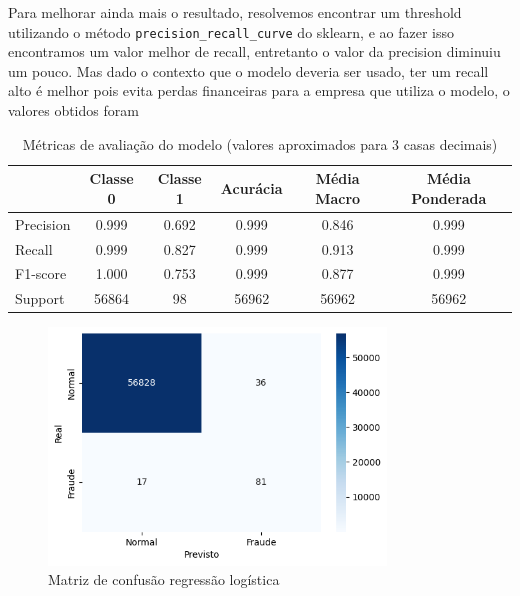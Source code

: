 \documentclass[conference]{IEEEtran}
\begin{document}
  Para melhorar ainda mais o resultado, resolvemos encontrar um threshold utilizando o método \texttt{precision\_recall\_curve} do sklearn, e ao fazer isso encontramos um valor melhor de recall, entretanto o valor da precision diminuiu um pouco. Mas dado o contexto que o modelo deveria ser usado, ter um recall alto é melhor pois evita perdas financeiras para a empresa que utiliza o modelo, o valores obtidos foram
  \begin{table}[H]
    \centering
    \begin{tabular}{lccccc}
        \toprule
                           & \textbf{Classe 0} & \textbf{Classe 1} & \textbf{Acurácia} & \textbf{Média Macro} & \textbf{Média Ponderada} \\
        \midrule
        Precision  & 0.999  & 0.692  & 0.999  & 0.846  & 0.999   \\
        Recall     & 0.999  & 0.827  & 0.999  & 0.913  & 0.999   \\
        F1-score   & 1.000  & 0.753  & 0.999  & 0.877  & 0.999   \\
        Support    & 56864  & 98     & 56962  & 56962  & 56962   \\
        \bottomrule
    \end{tabular}
    \caption{Métricas de avaliação do modelo (valores aproximados para 3 casas decimais)}
    \label{tab:matriz_confusao_regressao_logistica_com_threshold}
\end{table}
  \begin{figure}[H]
    \centering
    \includegraphics[width=0.8\textwidth]{../output/matriz de confusao com threshold regressao logistica.png}
    \caption{Matriz de confusão regressão logística}
    \label{fig:matriz_confusao_regressao_logistica_com_threshold}
  \end{figure}
\end{document}
